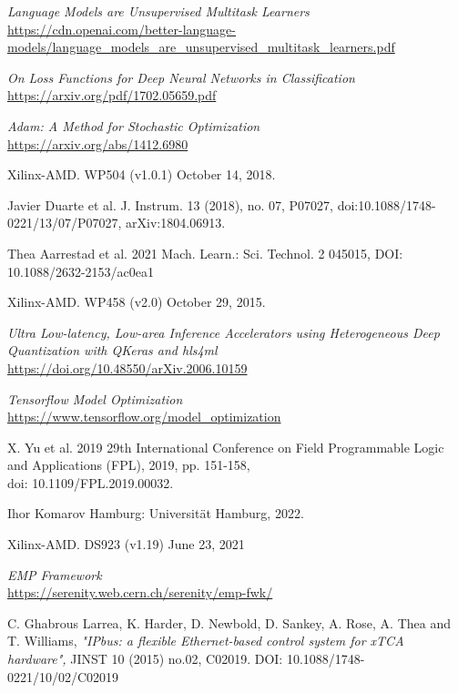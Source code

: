 \begin{thebibliography}{99}
\textit{Language Models are Unsupervised Multitask Learners}
\\\url{https://cdn.openai.com/better-language-models/language_models_are_unsupervised_multitask_learners.pdf}

\textit{On Loss Functions for Deep Neural Networks
in Classification}
\\\url{https://arxiv.org/pdf/1702.05659.pdf}

\textit{Adam: A Method for Stochastic Optimization}
\\\url{https://arxiv.org/abs/1412.6980}

Xilinx-AMD.
WP504 (v1.0.1) October 14, 2018.

Javier Duarte et al.
J. Instrum. 13 (2018),
no. 07, P07027, doi:10.1088/1748-0221/13/07/P07027, arXiv:1804.06913.

Thea Aarrestad et al.
2021 Mach. Learn.: Sci. Technol. 2 045015,
DOI: 10.1088/2632-2153/ac0ea1

Xilinx-AMD.
WP458 (v2.0) October 29, 2015.

\textit{Ultra Low-latency, Low-area Inference Accelerators using Heterogeneous Deep Quantization with QKeras and hls4ml}
\\\url{https://doi.org/10.48550/arXiv.2006.10159}

\textit{Tensorflow Model Optimization}
\\\url{https://www.tensorflow.org/model_optimization}

X. Yu et al.
2019 29th International Conference on Field Programmable Logic and Applications (FPL), 2019, pp. 151-158, \\
doi: 10.1109/FPL.2019.00032.

Ihor Komarov
Hamburg: Universität Hamburg, 2022.

Xilinx-AMD.
DS923 (v1.19) June 23, 2021

\textit{EMP Framework}
\\\url{https://serenity.web.cern.ch/serenity/emp-fwk/}

C. Ghabrous Larrea, K. Harder, D. Newbold, D. Sankey, A. Rose, A. Thea and T. Williams,
\textit{"IPbus: a flexible Ethernet-based control system for xTCA hardware",}
JINST 10 (2015) no.02, C02019. DOI: 10.1088/1748-0221/10/02/C02019

\end{thebibliography}

